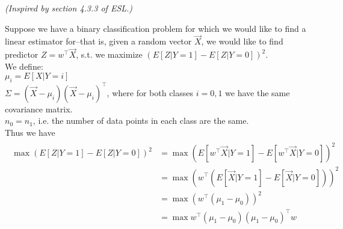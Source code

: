 \textit{(Inspired by section 4.3.3 of ESL.)}

Suppose we have a binary classification problem for which we would like to find a linear estimator for--that is,
given a random vector $\vec{X}$, we would like to find predictor $Z = w^\top \vec{X}$, s.t. we maximize $(E[Z|Y=1] - E[Z|Y=0])^2$.\\

We define:\\
$\mu_i = E[X|Y=i]$\\
$\Sigma = (\vec{X}-\mu_i)(\vec{X}-\mu_i)^\top$, where for both classes $i=0,1$ we have the same covariance matrix.\\
$n_0 = n_1$, i.e. the number of data points in each class are the same.\\

Thus we have
\begin{align*}
\begin{aligned}
\max (E[Z|Y=1] - E[Z|Y=0])^2 &= \max (E[w^\top \vec{X}|Y=1] - E[w^\top \vec{X}|Y=0])^2 \\
&= \max (w^\top (E[\vec{X}|Y=1] - E[\vec{X}|Y=0]))^2 \\
&= \max (w^\top (\mu_1 - \mu_0))^2\\
&= \max w^\top (\mu_1 - \mu_0)(\mu_1 - \mu_0)^\top w
\end{aligned}
\end{align*}

